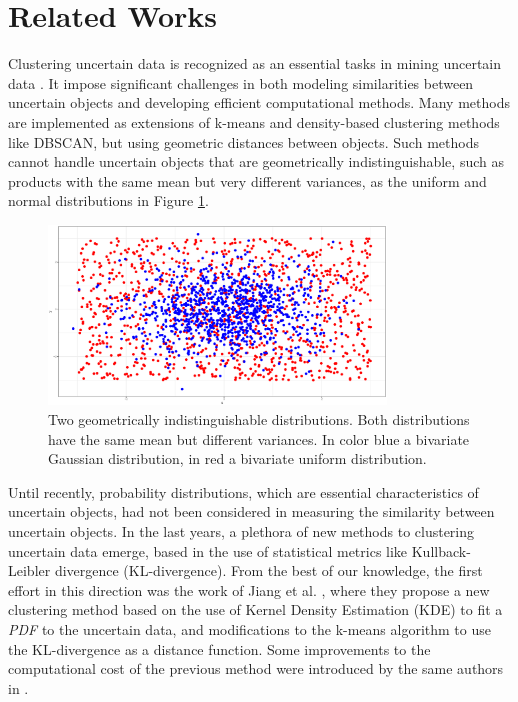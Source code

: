 \section{Related Works}\label{sec:related_works}
Clustering uncertain data is recognized as an essential tasks in mining uncertain data \cite{Jiang2011}. It impose significant challenges in both modeling similarities between uncertain objects and developing efficient computational methods. Many methods are implemented as extensions of k-means and density-based clustering methods like DBSCAN, but using geometric distances between objects. Such methods cannot handle uncertain objects that are geometrically indistinguishable, such as products with the same mean but very different variances, as the uniform and normal distributions in Figure \ref{fig:normal_uniform}.

\begin{figure}[H]
    \centering
    \includegraphics[width=0.8\textwidth]{img/gld_clustering/normal_uniform.eps}
    \caption{Two geometrically indistinguishable distributions. Both distributions have the same mean but different variances. In color blue a bivariate Gaussian distribution, in red a bivariate uniform distribution.}
    \label{fig:normal_uniform}
\end{figure}

Until recently, probability distributions, which are essential characteristics of uncertain objects, had not been considered in measuring the similarity between uncertain objects. In the last years, a plethora of new methods to clustering uncertain data emerge, based in the use of statistical metrics like Kullback-Leibler divergence (KL-divergence). From the best of our knowledge, the first effort in this direction was the work of Jiang et al. \cite{Jiang2011}, where they propose a new clustering method based on the use of Kernel Density Estimation (KDE) to fit a \textit{PDF} to the uncertain data, and modifications to the k-means algorithm to use the KL-divergence as a distance function. Some improvements to the computational cost of the previous method were introduced by the same authors in \cite{Jiang2013}.

